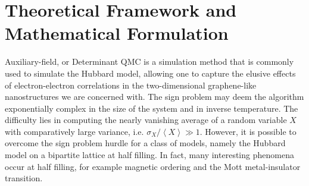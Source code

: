 \section{Theoretical Framework and Mathematical Formulation}
\label{sec:matform}

Auxiliary-field, or Determinant \acs{QMC} is a simulation method that is commonly used to simulate the Hubbard model, allowing one to capture the elusive effects of electron-electron correlations in the two-dimensional graphene-like nanostructures we are concerned with.
The sign problem may deem the algorithm exponentially complex in the size of the system and in inverse temperature.
The difficulty lies in computing the nearly vanishing average of a random variable $X$ with comparatively large variance, i.e. $\sigma_X / \left\langle X \right\rangle \gg 1$.
However, it is possible to overcome the sign problem hurdle for a class of models, namely the Hubbard model on a bipartite lattice at half filling.
In fact, many interesting phenomena occur at half filling, for example magnetic ordering and the Mott metal-insulator transition.

